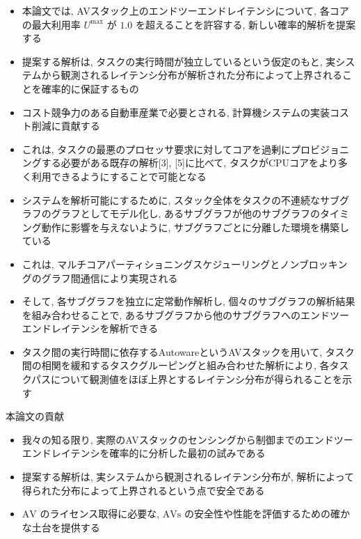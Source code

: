 \begin{frame}{}
    \begin{itemize}
        \item 本論文では, AVスタック上のエンドツーエンドレイテンシについて, 各コアの最大利用率 $U^{\max }$ が $1.0$ を超えることを許容する, 新しい確率的解析を提案する
        \item 提案する解析は, タスクの実行時間が独立しているという仮定のもと, 実システムから観測されるレイテンシ分布が解析された分布によって上界されることを確率的に保証するもの
        \item コスト競争力のある自動車産業で必要とされる, 計算機システムの実装コスト削減に貢献する
        \item これは, タスクの最悪のプロセッサ要求に対してコアを過剰にプロビジョニングする必要がある既存の解析[3], [5]に比べて, タスクがCPUコアをより多く利用できるようにすることで可能となる
    \end{itemize}
\end{frame}

\begin{frame}{}
    \begin{itemize}
        \item システムを解析可能にするために, スタック全体をタスクの不連続なサブグラフのグラフとしてモデル化し, あるサブグラフが他のサブグラフのタイミング動作に影響を与えないように, サブグラフごとに分離した環境を構築している
        \item これは, マルチコアパーティショニングスケジューリングとノンブロッキングのグラフ間通信により実現される
        \item そして, 各サブグラフを独立に定常動作解析し, 個々のサブグラフの解析結果を組み合わせることで, あるサブグラフから他のサブグラフへのエンドツーエンドレイテンシを解析できる
        \item タスク間の実行時間に依存するAutowareというAVスタックを用いて, タスク間の相関を緩和するタスクグルーピングと組み合わせた解析により, 各タスクパスについて観測値をほぼ上界とするレイテンシ分布が得られることを示す
    \end{itemize}
\end{frame}

\begin{frame}{本論文の貢献}
    \begin{itemize}
        \item  我々の知る限り, 実際のAVスタックのセンシングから制御までのエンドツーエンドレイテンシを確率的に分析した最初の試みである

        \item  提案する解析は, 実システムから観測されるレイテンシ分布が, 解析によって得られた分布によって上界されるという点で安全である

        \item  $\mathrm{AV}$ のライセンス取得に必要な, $\mathrm{AVs}$ の安全性や性能を評価するための確かな土台を提供する

    \end{itemize}
\end{frame}
